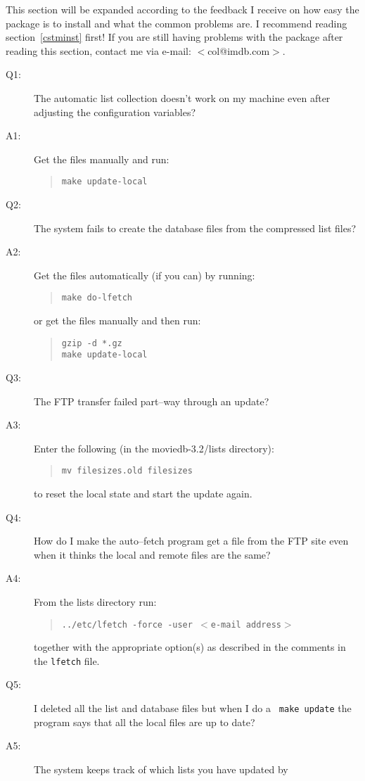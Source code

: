 This section will be expanded according to the feedback I receive on how
easy the package is to install and what the common problems are. I 
recommend
reading section~\ref{cstminst} first! If you are still having problems 
with the package after reading this section, contact me via e-mail: 
$<$col@imdb.com$>$.

\begin{description}
\item[Q1:] The automatic list collection doesn't work on my machine even 
after
     adjusting the configuration variables?
\item[A1:] Get the files manually and run:
\begin{quote}
{\tt make update-local}
\end{quote}
\item[Q2:] The system fails to create the database files from the 
compressed list
     files?
\item[A2:] Get the files automatically (if you can) by running:
\begin{quote}
{\tt make do-lfetch}
\end{quote}
or get the files manually and then run:
\begin{quote}
{\tt gzip -d *.gz}\\
{\tt make update-local}
\end{quote}
\item[Q3:] The FTP transfer failed part--way through an update?
\item[A3:] Enter the following (in the moviedb-3.2/lists directory):
\begin{quote}
{\tt mv filesizes.old filesizes}
\end{quote}
to reset the local state and start the update again.
\item[Q4:] How do I make the auto--fetch program get a file from the FTP 
site even
     when it thinks the local and remote files are the same?
\item[A4:] From the lists directory run: 
\begin{quote}
{\tt ../etc/lfetch -force -user $<$e-mail address$>$}
\end{quote}
together with the appropriate option(s) as described in the comments in
the {\tt lfetch} file.
\item[Q5:] I deleted all the list and database files but when I do a {\tt 
make 
update} the program says that all the local files are up to date?
\item[A5:] The system keeps track of which lists you have updated by 

\end{description}
